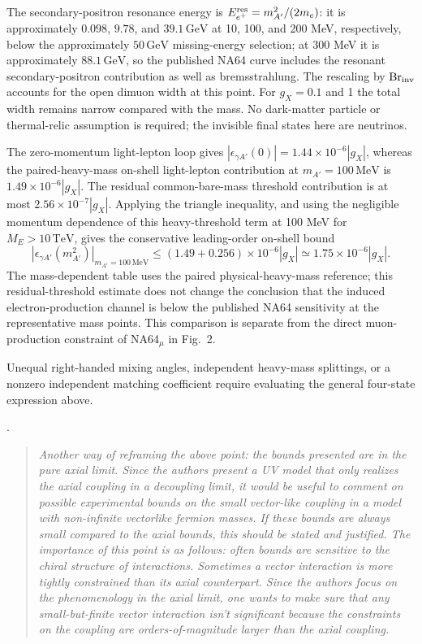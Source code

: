 \documentclass[12pt,a4paper]{article}
\begin{document}
The secondary-positron resonance energy is \(E_{e^+}^{\rm res}=m_{A'}^2/(2m_e)\): it is approximately \(0.098\), \(9.78\), and \(39.1\,\mathrm{GeV}\) at 10, 100, and 200 MeV, respectively, below the approximately \(50\,\mathrm{GeV}\) missing-energy selection; at 300 MeV it is approximately \(88.1\,\mathrm{GeV}\), so the published NA64 curve includes the resonant secondary-positron contribution as well as bremsstrahlung. The rescaling by \(\operatorname{Br}_{\rm inv}\) accounts for the open dimuon width at this point. For \(g_X=0.1\) and 1 the total width remains narrow compared with the mass. No dark-matter particle or thermal-relic assumption is required; the invisible final states here are neutrinos.

The zero-momentum light-lepton loop gives \(|\epsilon_{\gamma A'}(0)|=1.44\times10^{-6}|g_X|\), whereas the paired-heavy-mass on-shell light-lepton contribution at \(m_{A'}=100\,\mathrm{MeV}\) is \(1.49\times10^{-6}|g_X|\). The residual common-bare-mass threshold contribution is at most \(2.56\times10^{-7}|g_X|\). Applying the triangle inequality, and using the negligible momentum dependence of this heavy-threshold term at 100 MeV for \(M_E>10\,\mathrm{TeV}\), gives the conservative leading-order on-shell bound
\[
\left|\epsilon_{\gamma A'}(m_{A'}^2)\right|_{m_{A'}=100\,\mathrm{MeV}}
\leq (1.49+0.256)\times10^{-6}|g_X|
\simeq1.75\times10^{-6}|g_X|.
\]
The mass-dependent table uses the paired physical-heavy-mass reference; this residual-threshold estimate does not change the conclusion that the induced electron-production channel is below the published NA64 sensitivity at the representative mass points. This comparison is separate from the direct muon-production constraint of NA64\(_\mu\) in Fig.~2. 

Unequal right-handed mixing angles, independent heavy-mass splittings, or a nonzero independent matching coefficient require evaluating the general four-state expression above.

\medskip
{}.
\begin{quote}\itshape
Another way of reframing the above point: the bounds presented are in the pure axial limit. Since the authors present a UV model that only realizes the axial coupling in a decoupling limit, it would be useful to comment on possible experimental bounds on the small vector-like coupling in a model with non-infinite vectorlike fermion masses. If these bounds are always small compared to the axial bounds, this should be stated and justified. The importance of this point is as follows: often bounds are sensitive to the chiral structure of interactions. Sometimes a vector interaction is more tightly constrained than its axial counterpart. Since the authors focus on the phenomenology in the axial limit, one wants to make sure that any small-but-finite vector interaction isn't significant because the constraints on the coupling are orders-of-magnitude larger than the axial coupling.
\end{quote}
\end{document}
